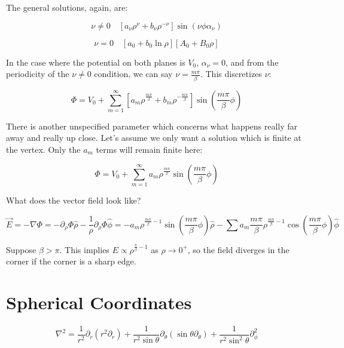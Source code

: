 \documentclass[a4paper,twoside,master.tex]{subfiles}
\begin{document}

The general solutions, again, are:

\begin{equation}
   \nu\neq0\quad[a_\nu\rho^\nu+b_\nu\rho^{-\nu}]\sin(\nu\phi\alpha_\nu)
\end{equation}

\begin{equation}
   \nu = 0\quad[a_0+b_0\ln\rho][A_0+B_0\rho]
\end{equation}

In the case where the potential on both planes is $V_0$, $\alpha_\nu = 0$, and from the periodicity of the $\nu\neq 0$ condition, we can say $\nu = \frac{m\pi}{\beta}$. This discretizes $\nu$:

\begin{equation}
   \Phi = V_0 + \sum_{m=1}^\infty[a_m\rho^{\frac{m\pi}{\beta}}+b_m\rho^{-{\frac{m\pi}{\beta}}}]\sin({\frac{m\pi}{\beta}}\phi)
\end{equation}

There is another unspecified parameter which concerns what happens really far away and really up close. Let's assume we only want a solution which is finite at the vertex. Only the $a_m$ terms will remain finite here:

\begin{equation}
   \Phi = V_0 + \sum_{m=1}^\infty a_m\rho^{\frac{m\pi}{\beta}}\sin({\frac{m\pi}{\beta}}\phi)
\end{equation}

What does the vector field look like?

\begin{equation}
    \vec{E} = -\nabla\Phi = -\partial_\rho\Phi\hat{\rho}-\frac{1}{\rho}\partial_\rho\Phi\hat{\phi} = -a_m\rho^{\frac{m\pi}{\beta}-1}\sin(\frac{m\pi}{\beta}\phi)\hat{\rho} - \sum a_m \frac{m\pi}{\beta} \rho^{\frac{m\pi}{\beta}-1}\cos(\frac{m\pi}{\beta}\phi)\hat{\phi}
\end{equation}

Suppose $\beta > \pi$. This implies $E\propto\rho^{\frac{\pi}{\beta}-1}$ as $\rho\to 0^+$, so the field diverges in the corner if the corner is a sharp edge.

\section{Spherical Coordinates}%
\label{sec:spherical_coordinates}

\begin{equation}
   \nabla^2 = \frac{1}{r^2}\partial_r(r^2\partial_r)+\frac{1}{r^2\sin\theta}\partial_\theta(\sin\theta\partial_\theta)+\frac{1}{r^2\sin^2\theta}\partial_\phi^2
\end{equation}
\end{document}
